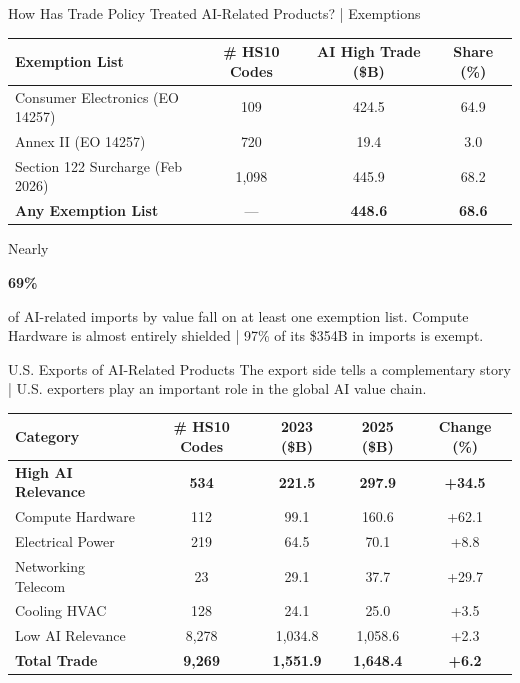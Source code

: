 \documentclass[11pt,pdftex,aspectratio=1610]{beamer}
\begin{document}
\begin{frame}[t]{How Has Trade Policy Treated AI-Related Products? | Exemptions}
\begin{table}[t]
\centering
\setlength{\tabcolsep}{1.5mm}
\renewcommand{\arraystretch}{1.25}
\begin{tabular}{lccc}
\toprule
Exemption List & \# HS10 Codes & AI High Trade (\$B) & Share (\%) \\
\midrule
Consumer Electronics (EO 14257) & 109 & 424.5 & 64.9 \\
Annex II (EO 14257) & 720 & 19.4 & 3.0 \\
Section 122 Surcharge (Feb 2026) & 1,098 & 445.9 & 68.2 \\
\midrule
\textbf{Any Exemption List} & --- & \textbf{448.6} & \textbf{68.6} \\
\bottomrule
\end{tabular}
\end{table}
\medskip
Nearly \begin{alert}{\textbf{69\%}}\end{alert} of AI-related imports by value fall on at least one exemption list. Compute Hardware is almost entirely shielded | 97\% of its \$354B in imports is exempt.
\end{frame}


\begin{frame}[t]{U.S. Exports of AI-Related Products}
\smallskip
The export side tells a complementary story | U.S. exporters play an important role in the global AI value chain.\\
\bigskip
\begin{table}[t]
\centering
\setlength{\tabcolsep}{2.0mm}
\renewcommand{\arraystretch}{1.05}
\begin{tabular}{lcccc}
\toprule
Category & \# HS10 Codes & 2023 (\$B) & 2025 (\$B) & Change (\%) \\
\midrule
\textbf{High AI Relevance} & \textbf{534} & \textbf{221.5} & \textbf{297.9} & \textbf{+34.5} \\
\quad Compute Hardware & 112 & 99.1 & 160.6 & +62.1 \\
\quad Electrical Power & 219 & 64.5 & 70.1 & +8.8 \\
\quad Networking Telecom & 23 & 29.1 & 37.7 & +29.7 \\
\quad Cooling HVAC & 128 & 24.1 & 25.0 & +3.5 \\
\midrule
Low AI Relevance & 8,278 & 1,034.8 & 1,058.6 & +2.3 \\
\midrule
\textbf{Total Trade} & \textbf{9,269} & \textbf{1,551.9} & \textbf{1,648.4} & \textbf{+6.2} \\
\bottomrule
\end{tabular}
\end{table}
\end{frame}
\end{document}

